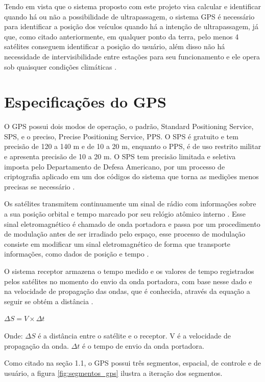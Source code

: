 Tendo em vista que o sistema proposto com este projeto visa calcular e
identificar quando há ou não a possibilidade de ultrapassagem, o sistema
GPS é necessário para identificar a posição dos veículos quando há a
intenção de ultrapassagem, já que, como citado anteriormente, em qualquer
ponto da terra, pelo menos 4 satélites conseguem identificar a posição do
usuário, além disso não há necessidade de intervisibilidade entre estações
para seu funcionamento e ele opera sob quaisquer condições climáticas \cite{sobre_gps}.

\section{Especificações do GPS}

O GPS possui dois modos de operação, o padrão, Standard Positioning Service,
SPS, e o preciso, Precise Positioning Service, PPS. O SPS é gratuito e tem
precisão de 120 a 140 m e de 10 a 20 m, enquanto o PPS, é de uso restrito
militar e apresenta precisão de 10 a 20 m. O SPS tem precisão limitada e
seletiva imposta pelo Departamento de Defesa Americano, por um processo de
criptografia aplicado em um dos códigos do sistema que torna as medições
menos precisas se necessário \cite{6gps}.

Os satélites transmitem continuamente um sinal de rádio com informações sobre
a sua posição orbital e tempo marcado por seu relógio atômico interno \cite{7gps}.
 Esse sinal eletromagnético é chamado de onda portadora e passa por um
 procedimento de modulação antes de ser irradiado pelo espaço, esse processo
 de modulação consiste em modificar um sinal eletromagnético de forma que
 transporte informações, como dados de posição e tempo \cite{8gps}.

O sistema receptor armazena o tempo medido e os valores de tempo registrados
pelos satélites no momento do envio da onda portadora, com base nesse dado e
 na velocidade de propagação das ondas, que é conhecida, através da equação
 a seguir se obtém a distância \cite{8gps}.

 $ \Delta S = V \times  \Delta t $

 Onde:
 $ \Delta S $ é a distância entre o satélite e o receptor.
V é a velocidade de propagação da onda.
$ \Delta t $ é o tempo de envio da onda portadora.

Como citado na seção 1.1, o GPS possui três segmentos, espacial, de controle e
de usuário, a figura \ref{fig:segmentos_gps} ilustra a iteração dos segmentos.


